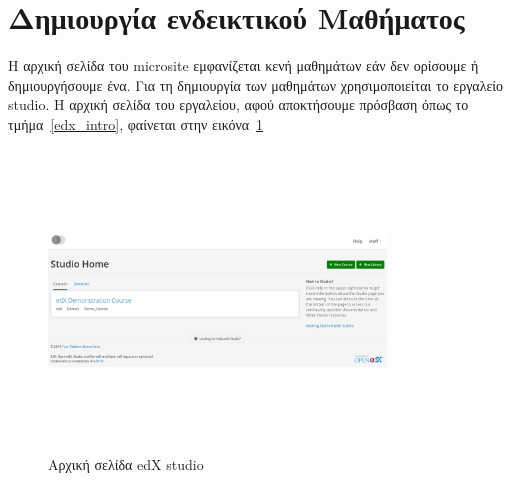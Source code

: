 \documentclass[12pt]{report}
\begin{document}
\section{Δημιουργία ενδεικτικού Μαθήματος}
Η αρχική σελίδα του \textlatin{microsite} εμφανίζεται κενή μαθημάτων εάν δεν ορίσουμε ή δημιουργήσουμε ένα. Για τη δημιουργία των μαθημάτων χρησιμοποιείται το εργαλείο \textlatin{studio}. Η αρχική σελίδα του εργαλείου, αφού αποκτήσουμε πρόσβαση όπως το τμήμα~\ref{edx_intro}, φαίνεται στην εικόνα~\ref{fig:edx-studio-landing}
\begin{figure}[h]
\centering
\includegraphics[width=0.8\textwidth, height=8cm]{edx-studio-landing}
\caption{Αρχική σελίδα \textlatin{edX studio}}
\label{fig:edx-studio-landing}
\end{figure}
\end{document}
